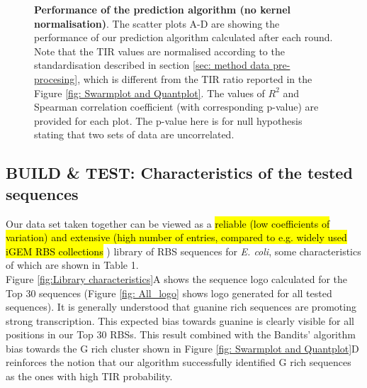 \documentclass{article}
\begin{document}
\begin{figure}[!ht]
\begin{subfigure}[b]{0.49\textwidth}
    \end{subfigure}
    \caption{\textbf{Performance of the prediction algorithm (no kernel normalisation)}. The scatter plots A-D are showing the performance of our prediction algorithm calculated after each round.
    Note that the TIR values are normalised according to the standardisation described in section \ref{sec: method data pre-procesing}, which is different from the TIR ratio reported in the Figure \ref{fig: Swarmplot and Quantplot}.
    The values of $R^2$ and Spearman correlation coefficient (with corresponding p-value) are provided for each plot.
    The p-value here is for null hypothesis stating that two sets of data are uncorrelated.
    }
    \label{fig: Scatterplot}
\end{figure}

\subsection{BUILD \& TEST: Characteristics of the tested sequences}
\label{sec:characteristics-of-library}

Our data set taken together can be viewed as a \hl{reliable (low coefficients of variation) and extensive (high number of entries, compared to e.g. widely used iGEM RBS collections} \cite{IGEM}) library of RBS sequences for \emph{E. coli}, some characteristics of which are shown in Table 1.\\

Figure \ref{fig:Library characteristics}A shows the sequence logo calculated for the Top 30 sequences (Figure \ref{fig: All_logo} shows logo generated for all tested sequences).
It is generally understood that guanine rich sequences are promoting strong transcription.
This expected bias towards guanine is clearly visible for all positions in our Top 30 RBSs.
This result combined with the Bandits' algorithm bias towards the G rich cluster shown in Figure \ref{fig: Swarmplot and Quantplot}D reinforces the notion that our algorithm successfully identified G rich sequences as the ones with high TIR probability.\\
\end{document}
